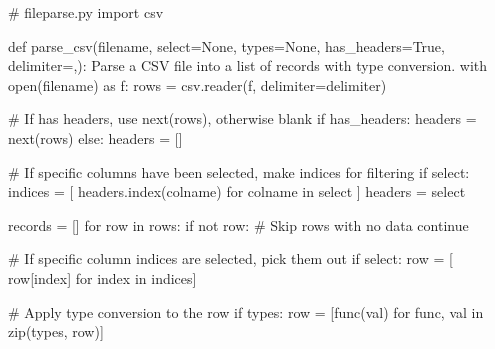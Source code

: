 \documentclass[
  letterpaper,
  DIV=11,
  numbers=noendperiod]{scrreprt}
\newenvironment{Shaded}{\begin{snugshade}}{\end{snugshade}}
\newcommand{\BuiltInTok}[1]{\textcolor[rgb]{0.00,0.46,0.62}{#1}}
\newcommand{\CommentTok}[1]{\textcolor[rgb]{0.37,0.37,0.37}{#1}}
\newcommand{\ControlFlowTok}[1]{\textcolor[rgb]{0.00,0.46,0.62}{#1}}
\newcommand{\ImportTok}[1]{\textcolor[rgb]{0.00,0.46,0.62}{#1}}
\newcommand{\KeywordTok}[1]{\textcolor[rgb]{0.00,0.46,0.62}{#1}}
\newcommand{\NormalTok}[1]{\textcolor[rgb]{0.00,0.46,0.62}{#1}}
\newcommand{\OperatorTok}[1]{\textcolor[rgb]{0.37,0.37,0.37}{#1}}
\newcommand{\StringTok}[1]{\textcolor[rgb]{0.13,0.47,0.30}{#1}}
\newcommand{\VariableTok}[1]{\textcolor[rgb]{0.07,0.07,0.07}{#1}}
\begin{document}
\begin{Shaded}
\begin{Highlighting}[]
\CommentTok{\# fileparse.py}
\ImportTok{import}\NormalTok{ csv}

\KeywordTok{def}\NormalTok{ parse\_csv(filename, select}\OperatorTok{=}\VariableTok{None}\NormalTok{, types}\OperatorTok{=}\VariableTok{None}\NormalTok{, has\_headers}\OperatorTok{=}\VariableTok{True}\NormalTok{, delimiter}\OperatorTok{=}\StringTok{\textquotesingle{},\textquotesingle{}}\NormalTok{):}
    \CommentTok{\textquotesingle{}\textquotesingle{}\textquotesingle{}}
\CommentTok{    Parse a CSV file into a list of records with type conversion.}
\CommentTok{    \textquotesingle{}\textquotesingle{}\textquotesingle{}}
    \ControlFlowTok{with} \BuiltInTok{open}\NormalTok{(filename) }\ImportTok{as}\NormalTok{ f:}
\NormalTok{        rows }\OperatorTok{=}\NormalTok{ csv.reader(f, delimiter}\OperatorTok{=}\NormalTok{delimiter)}

        \CommentTok{\# If has headers, use next(rows), otherwise blank}
        \ControlFlowTok{if}\NormalTok{ has\_headers:}
\NormalTok{            headers }\OperatorTok{=} \BuiltInTok{next}\NormalTok{(rows)}
        \ControlFlowTok{else}\NormalTok{:}
\NormalTok{            headers }\OperatorTok{=}\NormalTok{ []}

        \CommentTok{\# If specific columns have been selected, make indices for filtering }
        \ControlFlowTok{if}\NormalTok{ select:}
\NormalTok{            indices }\OperatorTok{=}\NormalTok{ [ headers.index(colname) }\ControlFlowTok{for}\NormalTok{ colname }\KeywordTok{in}\NormalTok{ select ]}
\NormalTok{            headers }\OperatorTok{=}\NormalTok{ select}

\NormalTok{        records }\OperatorTok{=}\NormalTok{ []}
        \ControlFlowTok{for}\NormalTok{ row }\KeywordTok{in}\NormalTok{ rows:}
            \ControlFlowTok{if} \KeywordTok{not}\NormalTok{ row:     }\CommentTok{\# Skip rows with no data}
                \ControlFlowTok{continue}

            \CommentTok{\# If specific column indices are selected, pick them out}
            \ControlFlowTok{if}\NormalTok{ select:}
\NormalTok{                row }\OperatorTok{=}\NormalTok{ [ row[index] }\ControlFlowTok{for}\NormalTok{ index }\KeywordTok{in}\NormalTok{ indices]}

            \CommentTok{\# Apply type conversion to the row}
            \ControlFlowTok{if}\NormalTok{ types:}
\NormalTok{                row }\OperatorTok{=}\NormalTok{ [func(val) }\ControlFlowTok{for}\NormalTok{ func, val }\KeywordTok{in} \BuiltInTok{zip}\NormalTok{(types, row)]}


\end{Highlighting}
\end{Shaded}
\end{document}
